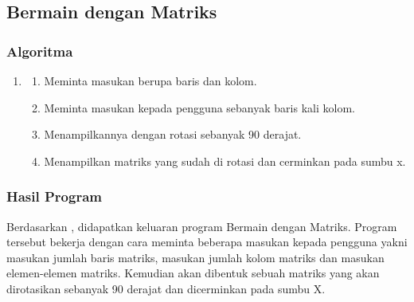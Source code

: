 \documentclass{subfiles}
\begin{document}
\subsection{Bermain dengan Matriks}
\subsubsection{Algoritma}
\begin{enumerate}
    \item []
    \begin{enumerate}
        \item{Meminta masukan berupa baris dan kolom.}
        \item{Meminta masukan kepada pengguna sebanyak baris kali kolom.}
        \item{Menampilkannya dengan rotasi sebanyak 90 derajat.}
        \item{Menampilkan matriks yang sudah di rotasi dan cerminkan pada sumbu x.}
    \end{enumerate}
\end{enumerate}

\subsubsection{\Flowchart}

\subsubsection{{\Source} {\sCode}}

\subsubsection{Hasil Program}
\begin{indentpar}
    \hspace{\parindent}Berdasarkan , didapatkan keluaran program Bermain dengan Matriks. Program tersebut bekerja dengan cara meminta beberapa masukan kepada pengguna yakni masukan jumlah baris matriks, masukan jumlah kolom matriks dan masukan elemen-elemen matriks. Kemudian akan dibentuk sebuah matriks yang akan dirotasikan sebanyak 90 derajat dan dicerminkan pada sumbu X.
\end{indentpar}
\end{document}
